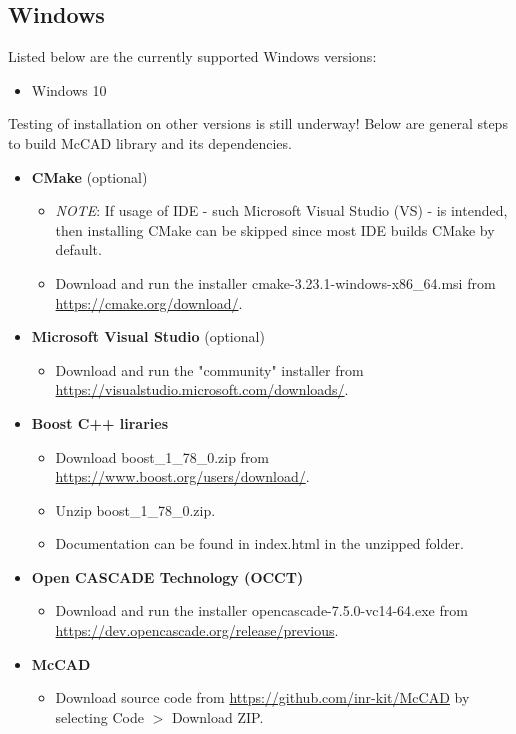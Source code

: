 \documentclass[letterpaper, 10 pt]{report}
\begin{document}
  \subsection{Windows}
  Listed below are the currently supported Windows versions:
  \begin{itemize}
  	\item Windows 10
  \end{itemize} 
  Testing of installation on other versions is still underway! Below are general steps to build McCAD library and its dependencies.
  \begin{itemize}
	\item \textbf{CMake} (optional)
 	\begin{itemize}
    	\item \emph{NOTE}: If usage of IDE - such Microsoft Visual Studio (VS) - is intended, then installing CMake can be skipped since most IDE builds CMake by default.
 		\item Download and run the installer cmake-3.23.1-windows-x86\_64.msi from \url{https://cmake.org/download/}.
  	\end{itemize}
	\item \textbf{Microsoft Visual Studio} (optional)
	\begin{itemize}
		\item Download and run the "community" installer from \url{https://visualstudio.microsoft.com/downloads/}.
	\end{itemize}
    \item \textbf{Boost C++ liraries}
    \begin{itemize}
    	\item Download boost\_1\_78\_0.zip from \url{https://www.boost.org/users/download/}.
    	\item Unzip boost\_1\_78\_0.zip.
    	\item Documentation can be found in index.html in the unzipped folder.
    \end{itemize}
    \item \textbf{Open CASCADE Technology (OCCT)}
	\begin{itemize}
		\item Download and run the installer opencascade-7.5.0-vc14-64.exe from \url{https://dev.opencascade.org/release/previous}.
	\end{itemize}
	\item \textbf{McCAD}
	\begin{itemize}
		\item Download source code from \url{https://github.com/inr-kit/McCAD} by selecting Code $>$ Download ZIP.

\end{itemize}
\end{itemize}
\end{document}
